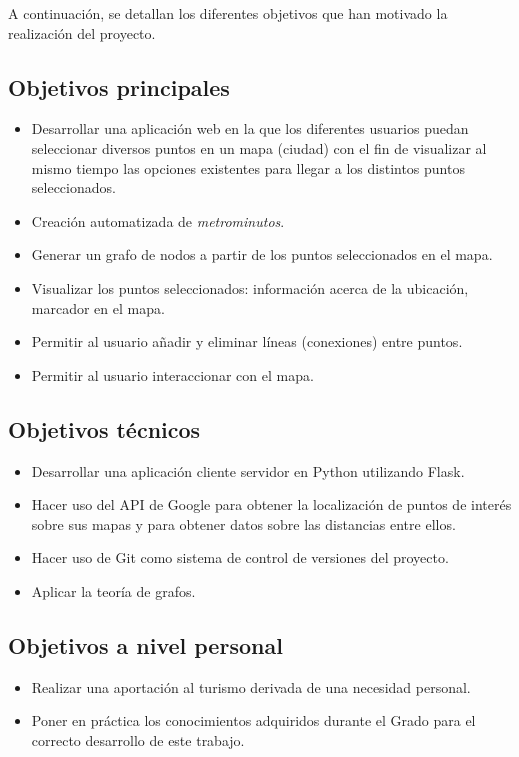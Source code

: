 
A continuación, se detallan los diferentes objetivos que han motivado la realización del proyecto.

\subsection{Objetivos principales}

\begin{itemize}
	\item Desarrollar una aplicación web en la que los diferentes usuarios puedan seleccionar diversos puntos en un mapa (ciudad) con el fin de visualizar al mismo tiempo las opciones existentes para llegar a los distintos puntos seleccionados.
	\item Creación automatizada de \textit{metrominutos}.
	\item Generar un grafo de nodos a partir de los puntos seleccionados en el mapa.
	\item Visualizar los puntos seleccionados: información acerca de la ubicación, marcador en el mapa.
	\item Permitir al usuario añadir y eliminar líneas (conexiones) entre puntos.
	\item Permitir al usuario interaccionar con el mapa.
\end{itemize}

\subsection{Objetivos técnicos}
\begin{itemize}
	\item Desarrollar una aplicación cliente servidor en Python utilizando Flask.
	\item Hacer uso del API de Google para obtener la localización de puntos de interés sobre sus mapas y para obtener datos sobre las distancias entre ellos.
	\item Hacer uso de Git como sistema de control de versiones del proyecto.
	\item Aplicar la teoría de grafos.
\end{itemize}
\subsection{Objetivos a nivel personal}
\begin{itemize}
	\item Realizar una aportación al turismo derivada de una necesidad personal.
	\item Poner en práctica los conocimientos adquiridos durante el Grado para el correcto desarrollo de este trabajo.
\end{itemize}
